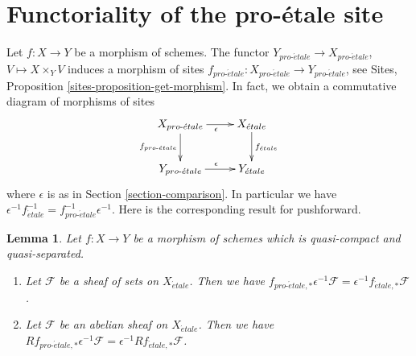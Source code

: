 \documentclass{stacks-project}
\theoremstyle{plain}
\newtheorem{lemma}[subsection]{Lemma}
\theoremstyle{definition}
\theoremstyle{remark}
\numberwithin{equation}{subsection}
\def\proetale{{pro\text{-}\acute{e}tale}}
\def\etale{{\acute{e}tale}}
\begin{document}
\section{Functoriality of the pro-\'etale site}
\label{section-morphism}

\noindent
Let $f : X \to Y$ be a morphism of schemes. The functor
$Y_\proetale \to X_\proetale$, $V \mapsto X \times_Y V$
induces a morphism of sites $f_\proetale : X_\proetale \to Y_\proetale$, see
Sites, Proposition \ref{sites-proposition-get-morphism}.
In fact, we obtain a commutative diagram of morphisms of sites
$$
\xymatrix{
X_\proetale \ar[r]_\epsilon \ar[d]_{f_\proetale} &
X_\etale \ar[d]^{f_\etale} \\
Y_\proetale \ar[r]^\epsilon & Y_\etale
}
$$
where $\epsilon$ is as in Section \ref{section-comparison}.
In particular we have
$\epsilon^{-1} f_\etale^{-1} = f_\proetale^{-1} \epsilon^{-1}$.
Here is the corresponding result for pushforward.

\begin{lemma}
\label{lemma-morphism-comparison}
Let $f : X \to Y$ be a morphism of schemes which is quasi-compact and
quasi-separated.
\begin{enumerate}
\item Let $\mathcal{F}$ be a sheaf of sets on $X_\etale$. Then we have
$f_{\proetale, *}\epsilon^{-1}\mathcal{F} =
\epsilon^{-1}f_{\etale, *}\mathcal{F}$.
\item Let $\mathcal{F}$ be an abelian sheaf on $X_\etale$. Then we have
$Rf_{\proetale, *}\epsilon^{-1}\mathcal{F} =
\epsilon^{-1}Rf_{\etale, *}\mathcal{F}$.
\end{enumerate}
\end{lemma}
\end{document}
